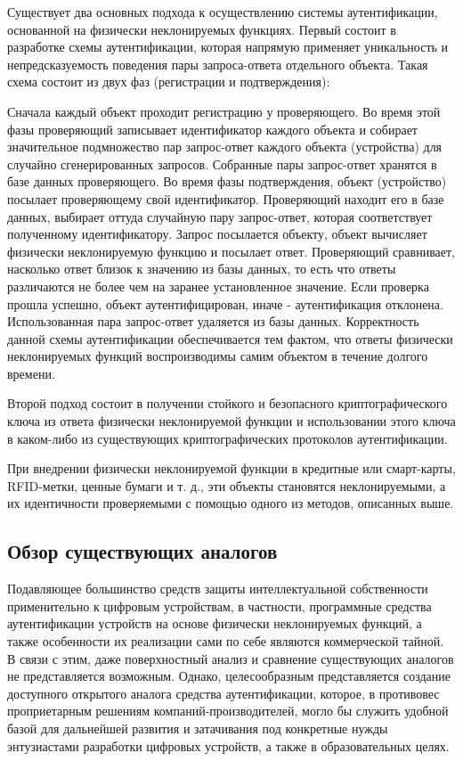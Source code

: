 Существует два основных подхода к осуществлению системы аутентификации, основанной на физически неклонируемых функциях. Первый состоит в разработке схемы аутентификации, которая напрямую применяет уникальность и непредсказуемость поведения пары запроса-ответа отдельного объекта. Такая схема состоит из двух фаз (регистрации и подтверждения):

Сначала каждый объект проходит регистрацию у проверяющего. Во время этой фазы проверяющий записывает идентификатор каждого объекта и собирает значительное подмножество пар запрос-ответ каждого объекта (устройства) для случайно сгенерированных запросов. Собранные пары запрос-ответ хранятся в базе данных проверяющего.
Во время фазы подтверждения, объект (устройство) посылает проверяющему свой идентификатор. Проверяющий находит его в базе данных, выбирает оттуда случайную пару запрос-ответ, которая соответствует полученному идентификатору. Запрос посылается объекту, объект вычисляет физически неклонируемую функцию и посылает ответ. Проверяющий сравнивает, насколько ответ близок к значению из базы данных, то есть что ответы различаются не более чем на заранее установленное значение. Если проверка прошла успешно, объект аутентифицирован, иначе - аутентификация отклонена. Использованная пара запрос-ответ удаляется из базы данных.
Корректность данной схемы аутентификации обеспечивается тем фактом, что ответы физически неклонируемых функций воспроизводимы самим объектом в течение долгого времени.

Второй подход состоит в получении стойкого и безопасного криптографического ключа из ответа физически неклонируемой функции и использовании этого ключа в каком-либо из существующих криптографических протоколов аутентификации.

При внедрении физически неклонируемой функции в кредитные или смарт-карты, RFID-метки, ценные бумаги и т. д., эти объекты становятся неклонируемыми, а их идентичности проверяемыми с помощью одного из методов, описанных выше.


\subsection{Обзор существующих аналогов}
Подавляющее большинство средств защиты интеллектуальной собственности применительно к цифровым устройствам, в частности, программные средства аутентификации устройств на основе физически неклонируемых функций, а также особенности их реализации сами по себе являются коммерческой тайной. В связи с этим, даже поверхностный анализ и сравнение существующих аналогов не представляется возможным. Однако, целесообразным представляется создание доступного открытого аналога средства аутентификации, которое, в противовес проприетарным решениям компаний-производителей, могло бы служить удобной базой для дальнейшей развития и затачивания под конкретные нужды энтузиастами разработки цифровых устройств, а также в образовательных целях.


